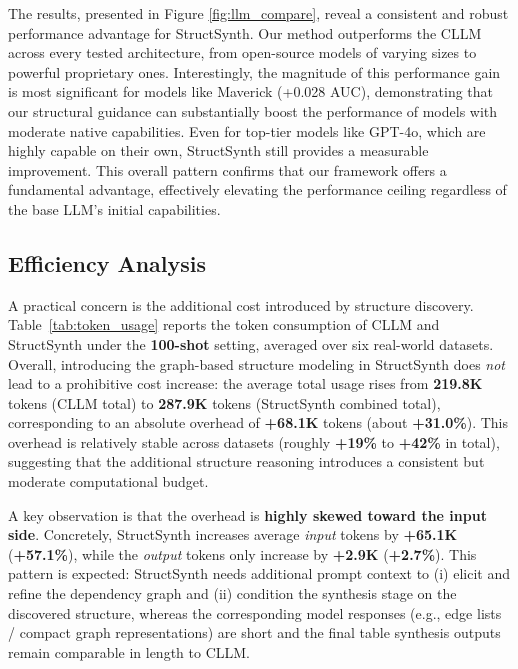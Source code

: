 The results, presented in Figure \ref{fig:llm_compare}, reveal a consistent and robust performance advantage for \textsf{StructSynth}. Our method outperforms the CLLM across every tested architecture, from open-source models of varying sizes to powerful proprietary ones. Interestingly, the magnitude of this performance gain is most significant for models like Maverick (+0.028 AUC), demonstrating that our structural guidance can substantially boost the performance of models with moderate native capabilities. Even for top-tier models like GPT-4o, which are highly capable on their own, \textsf{StructSynth} still provides a measurable improvement. This overall pattern confirms that our framework offers a fundamental advantage, effectively elevating the performance ceiling regardless of the base LLM's initial capabilities. 

\subsection{Efficiency Analysis}
\label{sec:efficiency}

A practical concern is the additional cost introduced by structure discovery. Table~\ref{tab:token_usage} reports the token consumption of \textsc{CLLM} and \textsf{StructSynth} under the \textbf{100-shot} setting, averaged over six real-world datasets. Overall, introducing the graph-based structure modeling in \textsf{StructSynth} does \emph{not} lead to a prohibitive cost increase: the average total usage rises from \textbf{219.8K} tokens (\textsc{CLLM} total) to \textbf{287.9K} tokens (\textsf{StructSynth} combined total), corresponding to an absolute overhead of \textbf{+68.1K} tokens (about \textbf{+31.0\%}). This overhead is relatively stable across datasets (roughly \textbf{+19\%} to \textbf{+42\%} in total), suggesting that the additional structure reasoning introduces a consistent but moderate computational budget.

A key observation is that the overhead is \textbf{highly skewed toward the input side}. Concretely, \textsf{StructSynth} increases average \emph{input} tokens by \textbf{+65.1K} (\textbf{+57.1\%}), while the \emph{output} tokens only increase by \textbf{+2.9K} (\textbf{+2.7\%}). This pattern is expected: \textsf{StructSynth} needs additional prompt context to (i) elicit and refine the dependency graph and (ii) condition the synthesis stage on the discovered structure, whereas the corresponding model responses (e.g., edge lists / compact graph representations) are short and the final table synthesis outputs remain comparable in length to \textsc{CLLM}.

